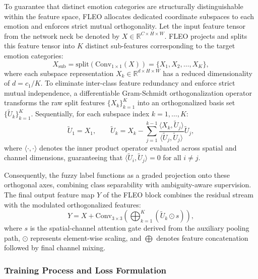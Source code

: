 \documentclass[algorithms,article,submit,moreauthors]{Definitions/mdpi}
\begin{document}
To guarantee that distinct emotion categories are structurally distinguishable within the feature space, FLEO allocates dedicated coordinate subspaces to each emotion and enforces strict mutual orthogonality. Let the input feature tensor from the network neck be denoted by $X \in \mathbb{R}^{C \times H \times W}$. FLEO projects and splits this feature tensor into $K$ distinct sub-features corresponding to the target emotion categories:
\begin{equation}
X_{\text{sub}} = \text{split}\left(\text{Conv}_{1\times1}(X)\right) = \{X_1, X_2, \dots, X_K\},
\label{eq:subspace_split}
\end{equation}
where each subspace representation $X_k \in \mathbb{R}^{d \times H \times W}$ has a reduced dimensionality of $d = c_1/K$. To eliminate inter-class feature redundancy and enforce strict mutual independence, a differentiable Gram-Schmidt orthogonalization operator transforms the raw split features $\{X_k\}_{k=1}^{K}$ into an orthogonalized basis set $\{\tilde{U}_k\}_{k=1}^{K}$. Sequentially, for each subspace index $k = 1, \dots, K$:
\begin{equation}
\tilde{U}_1 = X_1, \qquad \tilde{U}_k = X_k - \sum_{j=1}^{k-1} \frac{\langle X_k, \tilde{U}_j \rangle}{\langle \tilde{U}_j, \tilde{U}_j \rangle} \tilde{U}_j,
\label{eq:gram_schmidt}
\end{equation}
where $\langle \cdot, \cdot \rangle$ denotes the inner product operator evaluated across spatial and channel dimensions, guaranteeing that $\langle \tilde{U}_i, \tilde{U}_j \rangle = 0$ for all $i \neq j$. 

Consequently, the fuzzy label functions as a graded projection onto these orthogonal axes, combining class separability with ambiguity-aware supervision. The final output feature map $Y$ of the FLEO block combines the residual stream with the modulated orthogonalized features:
\begin{equation}
Y = X + \text{Conv}_{3\times3}\left( \bigoplus_{k=1}^{K} \left( \tilde{U}_k \odot s \right) \right),
\label{eq:fleo_output}
\end{equation}
where $s$ is the spatial-channel attention gate derived from the auxiliary pooling path, $\odot$ represents element-wise scaling, and $\bigoplus$ denotes feature concatenation followed by final channel mixing.

\subsubsection{Training Process and Loss Formulation}
\end{document}
